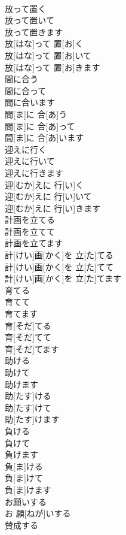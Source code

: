 \documentclass[8pt]{extreport}
\begin{document}
\begin{CJK}{UTF8}{min}
\\	放って置く 
\\	放って置いて 
\\	放って置きます	
\\	放[はな]って 置[お]く 
\\	放[はな]って 置[お]いて 
\\	放[はな]って 置[お]きます	
\\	間に合う 
\\	間に合って 
\\	間に合います	
\\	間[ま]に 合[あ]う 
\\	間[ま]に 合[あ]って 
\\	間[ま]に 合[あ]います	
\\	迎えに行く 
\\	迎えに行いて 
\\	迎えに行きます	
\\	迎[むか]えに 行[い]く 
\\	迎[むか]えに 行[い]いて 
\\	迎[むか]えに 行[い]きます	
\\	計画を立てる 
\\	計画を立てて 
\\	計画を立てます	
\\	計[けい]画[かく]を 立[た]てる 
\\	計[けい]画[かく]を 立[た]てて 
\\	計[けい]画[かく]を 立[た]てます	
\\	育てる 
\\	育てて 
\\	育てます	
\\	育[そだ]てる 
\\	育[そだ]てて 
\\	育[そだ]てます	
\\	助ける 
\\	助けて 
\\	助けます	
\\	助[たす]ける 
\\	助[たす]けて 
\\	助[たす]けます	
\\	負ける 
\\	負けて 
\\	負けます	
\\	負[ま]ける 
\\	負[ま]けて 
\\	負[ま]けます	
\\	お願いする	
\\	お 願[ねが]いする	
\\	賛成する	

\end{CJK}
\end{document}

